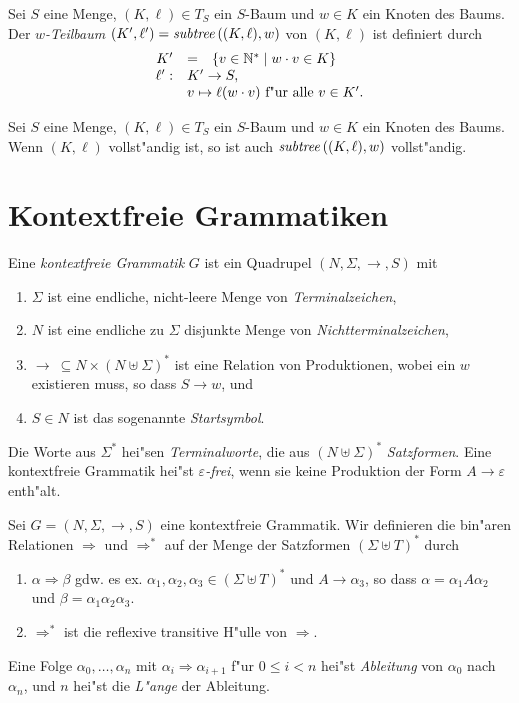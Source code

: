 \documentclass[12pt,a4paper]{article}
\begin{document}
\begin{definition}[Teilbaum]
  Sei $S$ eine Menge, $(K,\ell) \in T_S$ ein $S$-Baum und $w \in K$ ein Knoten des Baums.
  Der \emph{$w$-Teilbaum} $(K',\ell') = \mathit{subtree}\,((K,\ell),w)$ von $(K,\ell)$ ist definiert
  durch
  \[\begin{array}{rcl}
    K' &=& \{v \in \N^* \mid w \cdot v \in K\} \\
    \ell': & \multicolumn{2}{l}{K '\to S,} \\
    & \multicolumn{2}{l}{v \mapsto \ell(w \cdot v) \text{ f"ur alle $v \in K'$.}}
  \end{array}\]
\end{definition}

\begin{lemma}
  Sei $S$ eine Menge, $(K,\ell) \in T_S$ ein $S$-Baum und $w \in K$ ein Knoten des Baums.
  Wenn $(K,\ell)$ vollst"andig ist, so ist auch $\mathit{subtree}\,((K,\ell),w)$ vollst"andig.
\end{lemma}


\section{Kontextfreie Grammatiken}

Eine \emph{kontextfreie Grammatik} $G$ ist ein Quadrupel $(N,\Sigma,\to,S)$ mit
\begin{enumerate}
\item $\Sigma$ ist eine endliche, nicht-leere Menge von \emph{Terminalzeichen},
\item $N$ ist eine endliche zu $\Sigma$ disjunkte Menge von \emph{Nichtterminalzeichen},
\item $\to\ \subseteq N \times (N \uplus \Sigma)^*$ ist eine Relation von Produktionen, wobei ein $w$ existieren
  muss, so dass $S \to w$, und
\item $S \in N$ ist das sogenannte \emph{Startsymbol}.
\end{enumerate}
Die Worte aus $\Sigma^*$ hei"sen \emph{Terminalworte}, die aus $(N \uplus \Sigma)^*$ \emph{Satzformen}. Eine
kontextfreie Grammatik hei"st \emph{$\varepsilon$-frei}, wenn sie keine Produktion der Form
$A \to \varepsilon$ enth"alt.

\begin{definition}[Ableitungen]
  Sei $G=(N,\Sigma,\to,S)$ eine kontextfreie Grammatik. Wir definieren die bin"aren Relationen $\Rightarrow$
  und $\Rightarrow^*$ auf der Menge der Satzformen $(\Sigma \uplus T)^*$ durch
  \begin{enumerate}
  \item $\alpha \Rightarrow \beta$ gdw. es ex. $\alpha_1,\alpha_2,\alpha_3\in (\Sigma \uplus T)^*$ und
    $A \to \alpha_3$, so dass $\alpha = \alpha_1 A \alpha_2$ und $\beta = \alpha_1\alpha_2\alpha_3$.
  \item $\Rightarrow^*$ ist die reflexive transitive H"ulle von $\Rightarrow$.
  \end{enumerate}
  Eine Folge $\alpha_0,\ldots,\alpha_n$ mit $\alpha_i \Rightarrow \alpha_{i+1}$ f"ur $0 \le i < n$ hei"st
  \emph{Ableitung} von $\alpha_0$ nach $\alpha_n$, und $n$ hei"st die \emph{L"ange} der Ableitung.
\end{definition}
\end{document}

